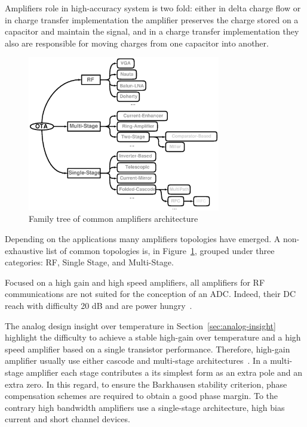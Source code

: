 Amplifiers role in high-accuracy system is two fold: either in delta charge flow or in charge transfer implementation the amplifier preserves the charge stored on a capacitor and maintain the signal, and in a charge transfer implementation they also are responsible for moving charges from one capacitor into another.

\begin{figure}[htp]
    \centering
    \includegraphics[width=0.75\textwidth]{Chapter7/Figs/family_amplifier.ps}
    \caption{Family tree of common amplifiers architecture}
    \label{fig:ota_tree}
\end{figure}

Depending on the applications many amplifiers topologies have emerged. A non-exhaustive list of common topologies is, in Figure~\ref{fig:ota_tree}, grouped under three categories: RF, Single Stage, and Multi-Stage.

Focused on a high gain and high speed amplifiers, all amplifiers for RF communications are not suited for the conception of an ADC\@. Indeed, their DC reach with difficulty 20 dB and are power hungry~\cite{Nauta1992, Chen2014}.

The analog design insight over temperature in Section~\ref{sec:analog-insight} highlight the difficulty to achieve a stable high-gain over temperature and a high speed amplifier based on a single transistor performance. Therefore, high-gain amplifier usually use either cascode and multi-stage architectures~\cite{Bult1990}. In a multi-stage amplifier each stage contributes a its simplest form as an extra pole and an extra zero. In this regard, to ensure the Barkhausen stability criterion, phase compensation schemes are required to obtain a good phase margin. 
To the contrary high bandwidth amplifiers use a single-stage architecture, high bias current and short channel devices.

